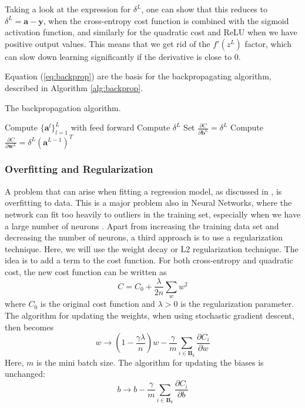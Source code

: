 Taking a look at the expression for $\delta^L$, one can show that this reduces to $\delta^L = \boldsymbol{a}-\boldsymbol{y}$, when the cross-entropy cost function is combined with the sigmoid activation function, and similarly for the quadratic cost and ReLU when we have positive output values. This means that we get rid of the $f'(z^L)$ factor, which can slow down learning significantly if the derivative is close to 0. 

Equation (\ref{eq:backprop}) are the basis for the backpropagating algorithm, described in Algorithm \ref{alg:backprop}.
\begin{algorithm}[htbp]\caption{The backpropagation algorithm.}\label{alg:backprop}
	\SetAlgoLined
	\BlankLine
	\BlankLine
	Compute $\{ \boldsymbol{a}^l\}_{l=1}^L$ with feed forward\;
	Compute $\delta^L$\;
	Set $\frac{\partial C}{\partial \boldsymbol{b}^L} = \delta^L$\;
	Compute $\frac{\partial C}{\partial \boldsymbol{w}^L} = \delta^L(\boldsymbol{a}^{L-1})^T$\;
	\BlankLine
	\BlankLine
	\end{algorithm}

\subsubsection*{Overfitting and Regularization}
A problem that can arise when fitting a regression model, as discussed in \cite{prosjekt1}, is overfitting to data. This is a major problem also in Neural Networks, where the network can fit too heavily to outliers in the training set, especially when we have a large number of neurons \citep{Nielsen}. Apart from increasing the training data set and decreasing the number of neurons, a third approach is to use a regularization technique. Here, we will use the weight decay or L2 regularization technique.
The idea is to add a term to the cost function. For both cross-entropy and quadratic cost, the new cost function can be written as
\begin{equation*}
  C = C_0 + \frac{\lambda}{2n}\sum_w w^2
\end{equation*}
where $C_0$ is the original cost function and $\lambda>0$ is the regularization parameter.
The algorithm for updating the weights, when using stochastic gradient descent, then becomes
\begin{equation}\label{eq:w_update}
  w \rightarrow \left(1-\frac{\gamma\lambda}{n}\right)w -  \frac{\gamma}{m}\sum_{i \in \boldsymbol{B}_k}\frac{\partial C_i}{\partial w}
\end{equation}
Here, $m$ is the mini batch size. The algorithm for updating the biases is unchanged:
\begin{equation}\label{eq:b_update}
  b \rightarrow b -  \frac{\gamma}{m}\sum_{i \in \boldsymbol{B}_k}\frac{\partial C_i}{\partial b}
\end{equation}


